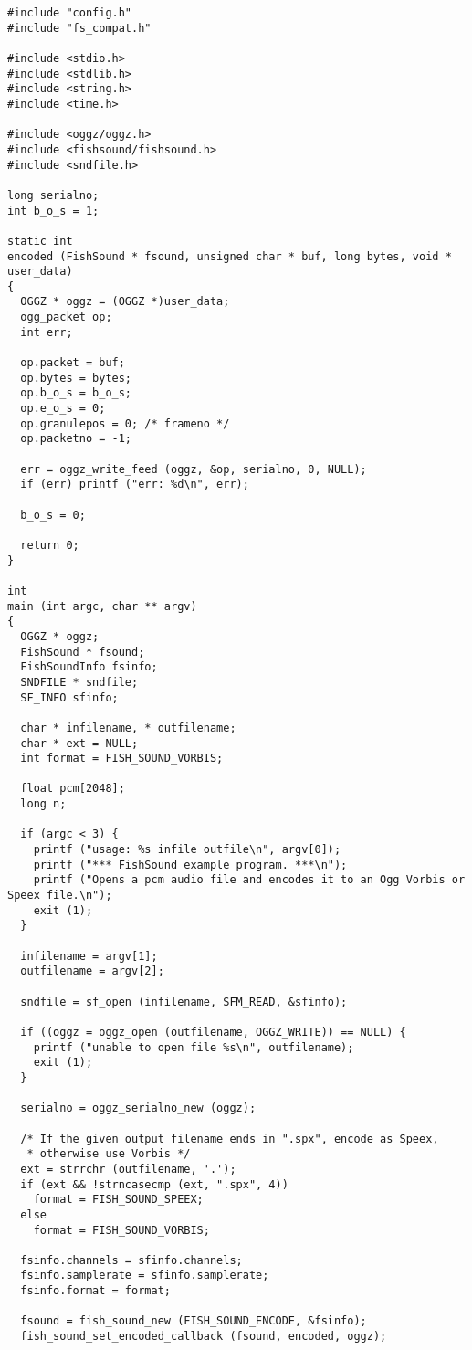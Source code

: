 \footnotesize\begin{verbatim}
#include "config.h"
#include "fs_compat.h"

#include <stdio.h>
#include <stdlib.h>
#include <string.h>
#include <time.h>

#include <oggz/oggz.h>
#include <fishsound/fishsound.h>
#include <sndfile.h>

long serialno;
int b_o_s = 1;

static int
encoded (FishSound * fsound, unsigned char * buf, long bytes, void * user_data)
{
  OGGZ * oggz = (OGGZ *)user_data;
  ogg_packet op;
  int err;

  op.packet = buf;
  op.bytes = bytes;
  op.b_o_s = b_o_s;
  op.e_o_s = 0;
  op.granulepos = 0; /* frameno */
  op.packetno = -1;

  err = oggz_write_feed (oggz, &op, serialno, 0, NULL);
  if (err) printf ("err: %d\n", err);

  b_o_s = 0;

  return 0;
}

int
main (int argc, char ** argv)
{
  OGGZ * oggz;
  FishSound * fsound;
  FishSoundInfo fsinfo;
  SNDFILE * sndfile;
  SF_INFO sfinfo;

  char * infilename, * outfilename;
  char * ext = NULL;
  int format = FISH_SOUND_VORBIS;

  float pcm[2048];
  long n;

  if (argc < 3) {
    printf ("usage: %s infile outfile\n", argv[0]);
    printf ("*** FishSound example program. ***\n");
    printf ("Opens a pcm audio file and encodes it to an Ogg Vorbis or Speex file.\n");
    exit (1);
  }

  infilename = argv[1];
  outfilename = argv[2];

  sndfile = sf_open (infilename, SFM_READ, &sfinfo);

  if ((oggz = oggz_open (outfilename, OGGZ_WRITE)) == NULL) {
    printf ("unable to open file %s\n", outfilename);
    exit (1);
  }

  serialno = oggz_serialno_new (oggz);

  /* If the given output filename ends in ".spx", encode as Speex,
   * otherwise use Vorbis */
  ext = strrchr (outfilename, '.');
  if (ext && !strncasecmp (ext, ".spx", 4))
    format = FISH_SOUND_SPEEX;
  else
    format = FISH_SOUND_VORBIS;

  fsinfo.channels = sfinfo.channels;
  fsinfo.samplerate = sfinfo.samplerate;
  fsinfo.format = format;

  fsound = fish_sound_new (FISH_SOUND_ENCODE, &fsinfo);
  fish_sound_set_encoded_callback (fsound, encoded, oggz);


\end{verbatim}
